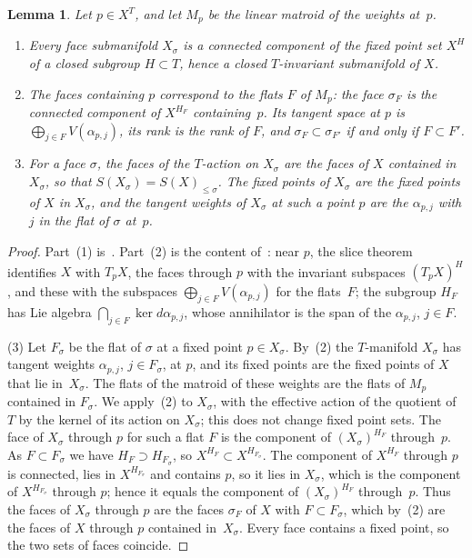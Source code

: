 \documentclass[11pt,a4paper]{article}
\numberwithin{equation}{section}
\theoremstyle{plain}
\newtheorem{lemma}[theorem]{Lemma}
\theoremstyle{definition}
\theoremstyle{remark}
\begin{document}
\begin{lemma}\label{lem:faces}
Let $p\in X^T$, and let $M_p$ be the linear matroid of the weights at~$p$.
\begin{enumerate}[nosep,label=(\arabic*)]
\item Every face submanifold $X_\sigma$ is a connected component of the fixed point set $X^H$ of a closed subgroup $H\subset T$, hence a closed $T$-invariant submanifold of $X$.
\item The faces containing $p$ correspond to the flats $F$ of $M_p$: the face $\sigma_F$ is the connected component of $X^{H_F}$ containing~$p$. Its tangent space at $p$ is $\bigoplus_{j\in F}V(\alpha_{p,j})$, its rank is the rank of $F$, and $\sigma_F\subset\sigma_{F'}$ if and only if $F\subset F'$.
\item For a face $\sigma$, the faces of the $T$-action on $X_\sigma$ are the faces of $X$ contained in $X_\sigma$, so that $S(X_\sigma)=S(X)_{\leqslant\sigma}$. The fixed points of $X_\sigma$ are the fixed points of $X$ in $X_\sigma$, and the tangent weights of $X_\sigma$ at such a point $p$ are the $\alpha_{p,j}$ with $j$ in the flat of $\sigma$ at~$p$.
\end{enumerate}
\end{lemma}

\begin{proof}
Part~(1) is~\cite[Lemma~2.8]{AC22}. Part~(2) is the content of~\cite[Lemma~2.10, Lemma~3.1 and Prop.~3.5]{AC22}: near $p$, the slice theorem identifies $X$ with $T_pX$, the faces through $p$ with the invariant subspaces $(T_pX)^H$, and these with the subspaces $\bigoplus_{j\in F}V(\alpha_{p,j})$ for the flats~$F$; the subgroup $H_F$ has Lie algebra $\bigcap_{j\in F}\ker d\alpha_{p,j}$, whose annihilator is the span of the $\alpha_{p,j}$, $j\in F$.

(3) Let $F_\sigma$ be the flat of $\sigma$ at a fixed point $p\in X_\sigma$. By~(2) the $T$-manifold $X_\sigma$ has tangent weights $\alpha_{p,j}$, $j\in F_\sigma$, at $p$, and its fixed points are the fixed points of $X$ that lie in~$X_\sigma$. The flats of the matroid of these weights are the flats of $M_p$ contained in $F_\sigma$. We apply~(2) to $X_\sigma$, with the effective action of the quotient of $T$ by the kernel of its action on $X_\sigma$; this does not change fixed point sets. The face of $X_\sigma$ through $p$ for such a flat $F$ is the component of $(X_\sigma)^{H_F}$ through~$p$. As $F\subset F_\sigma$ we have $H_F\supset H_{F_\sigma}$, so $X^{H_F}\subset X^{H_{F_\sigma}}$. The component of $X^{H_F}$ through $p$ is connected, lies in $X^{H_{F_\sigma}}$ and contains $p$, so it lies in $X_\sigma$, which is the component of $X^{H_{F_\sigma}}$ through $p$; hence it equals the component of $(X_\sigma)^{H_F}$ through~$p$. Thus the faces of $X_\sigma$ through $p$ are the faces $\sigma_F$ of $X$ with $F\subset F_\sigma$, which by~(2) are the faces of $X$ through $p$ contained in~$X_\sigma$. Every face contains a fixed point, so the two sets of faces coincide.
\end{proof}
\end{document}
